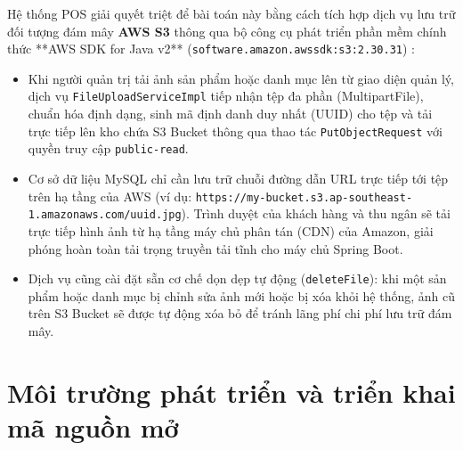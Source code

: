 Hệ thống POS giải quyết triệt để bài toán này bằng cách tích hợp dịch vụ lưu trữ đối tượng đám mây \textbf{AWS S3} thông qua bộ công cụ phát triển phần mềm chính thức **AWS SDK for Java v2** (\texttt{software.amazon.awssdk:s3:2.30.31}) \cite{awss3doc2024}:
\begin{itemize}[leftmargin=1.5cm]
    \item Khi người quản trị tải ảnh sản phẩm hoặc danh mục lên từ giao diện quản lý, dịch vụ \texttt{FileUploadServiceImpl} tiếp nhận tệp đa phần (MultipartFile), chuẩn hóa định dạng, sinh mã định danh duy nhất (UUID) cho tệp và tải trực tiếp lên kho chứa S3 Bucket thông qua thao tác \texttt{PutObjectRequest} với quyền truy cập \texttt{public-read}.
    \item Cơ sở dữ liệu MySQL chỉ cần lưu trữ chuỗi đường dẫn URL trực tiếp tới tệp trên hạ tầng của AWS (ví dụ: \texttt{https://my-bucket.s3.ap-southeast-1.amazonaws.com/uuid.jpg}). Trình duyệt của khách hàng và thu ngân sẽ tải trực tiếp hình ảnh từ hạ tầng máy chủ phân tán (CDN) của Amazon, giải phóng hoàn toàn tải trọng truyền tải tĩnh cho máy chủ Spring Boot.
    \item Dịch vụ cũng cài đặt sẵn cơ chế dọn dẹp tự động (\texttt{deleteFile}): khi một sản phẩm hoặc danh mục bị chỉnh sửa ảnh mới hoặc bị xóa khỏi hệ thống, ảnh cũ trên S3 Bucket sẽ được tự động xóa bỏ để tránh lãng phí chi phí lưu trữ đám mây.
\end{itemize}

\section{Môi trường phát triển và triển khai mã nguồn mở}
\label{sec:moi_truong_trien_khai}

